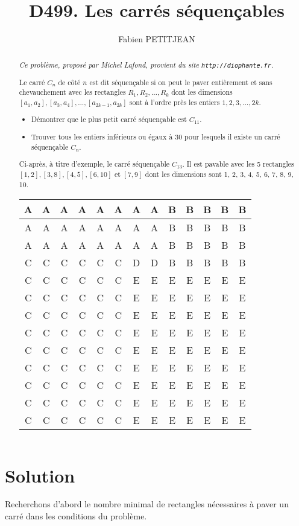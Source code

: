 \documentclass[10pt,a4paper,onecolumn]{article}
\author{Fabien PETITJEAN}
\title{D499. Les carrés séquençables}
\begin{document}
\maketitle
\begin{abstract}
{\it Ce problème, proposé par Michel Lafond, provient du site {\tt http://diophante.fr}.}

\vspace{.5cm}

Le carré $C_n$ de côté $n$ est dit séquençable si on peut le paver entièrement et sans chevauchement avec les rectangles $R_1,R_2, \ldots,R_k$  dont les dimensions $[a_1,a_2], [a_3,a_4],\ldots,[a_{2k-1} ,a_{2k}]$   sont à l’ordre près les entiers  $1,2,3,\ldots,2k$.
\begin{itemize}
\item Démontrer que le plus petit carré séquençable est $C_{11}$.
\item Trouver tous les entiers inférieurs ou égaux à 30 pour lesquels il existe un carré séquençable $C_n$.
\end{itemize}

Ci-après, à titre d'exemple, le carré séquençable $C_{13}$. Il est pavable avec les 5 rectangles $[1,2],[3,8],[4,5],[6,10]$ et $[7,9]$ dont les dimensions sont 1, 2, 3, 4, 5, 6, 7, 8, 9, 10.

\begin{tabular}{|c|c|c|c|c|c|c|c|c|c|c|c|c|}
\hline A&A&A&A&A&A&A&A&B&B&B&B&B \\
\hline A&A&A&A&A&A&A&A&B&B&B&B&B \\
\hline A&A&A&A&A&A&A&A&B&B&B&B&B \\
\hline C&C&C&C&C&C&D&D&B&B&B&B&B \\
\hline C&C&C&C&C&C&E&E&E&E&E&E&E \\
\hline C&C&C&C&C&C&E&E&E&E&E&E&E \\
\hline C&C&C&C&C&C&E&E&E&E&E&E&E \\
\hline C&C&C&C&C&C&E&E&E&E&E&E&E \\
\hline C&C&C&C&C&C&E&E&E&E&E&E&E \\
\hline C&C&C&C&C&C&E&E&E&E&E&E&E \\
\hline C&C&C&C&C&C&E&E&E&E&E&E&E \\
\hline C&C&C&C&C&C&E&E&E&E&E&E&E \\
\hline C&C&C&C&C&C&E&E&E&E&E&E&E \\
\hline
\end{tabular}
\end{abstract}

\section{Solution}
Recherchons d'abord le nombre minimal de rectangles nécessaires à paver un carré dans les conditions du problème.
\end{document}
